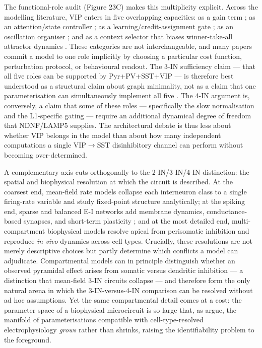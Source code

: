 \documentclass[11pt]{article}
\let\origrightarrow\rightarrow
\def\rightarrow{\ensuremath{\origrightarrow}}
\begin{document}
The functional-role audit (Figure 23C) makes this multiplicity explicit. Across the modelling literature, VIP enters in five overlapping capacities: as a gain term \citep{Hertag2019, Litwinkumar2016, Veit2023, Bos2025, Richter2022}; as an attention/state controller \citep{Garciadelmolino2017, Hahn2022, Waitzmann2024, Wagatsuma2022, Poort2022}; as a learning/credit-assignment gate \citep{Lee2025, Chevy2024, Wilmes2019, Hertag2020, Hertag2021}; as an oscillation organiser \citep{Veit2023, Cattani2024}; and as a context selector that biases winner-take-all attractor dynamics \citep{Shen2023, Yang2016, Furutachi2024}. These categories are not interchangeable, and many papers commit a model to one role implicitly by choosing a particular cost function, perturbation protocol, or behavioural readout. The 3-IN sufficiency claim --- that all five roles can be supported by Pyr+PV+SST+VIP --- is therefore best understood as a structural claim about graph minimality, not as a claim that one parameterisation can simultaneously implement all five \citep{Hertag2019, Litwinkumar2016, Bos2025}. The 4-IN argument \citep{Iqbal2025, Hartung2024, Vighagen2021} is, conversely, a claim that some of these roles --- specifically the slow normalisation and the L1-specific gating --- require an additional dynamical degree of freedom that NDNF/LAMP5 supplies. The architectural debate is thus less about whether VIP belongs in the model than about how many independent computations a single VIP\rightarrow SST disinhibitory channel can perform without becoming over-determined.

A complementary axis cuts orthogonally to the 2-IN/3-IN/4-IN distinction: the spatial and biophysical resolution at which the circuit is described. At the coarsest end, mean-field rate models \citep{Litwinkumar2016, Garciadelmolino2017, Sanzeni2020, Kim2025b} collapse each interneuron class to a single firing-rate variable and study fixed-point structure analytically; at the spiking end, sparse and balanced E-I networks \citep{Veit2023, Pedrosa2020, Rossbroich2025} add membrane dynamics, conductance-based synapses, and short-term plasticity \citep{Seay2020, Cattani2024}; and at the most detailed end, multi-compartment biophysical models \citep{Reimann2026, Jadi2012, Isbister2026, Morabito2024} resolve apical from perisomatic inhibition and reproduce \textit{in vivo} dynamics across cell types. Crucially, these resolutions are not merely descriptive choices but partly determine which conflicts a model can adjudicate. Compartmental models \citep{Reimann2026, Jadi2012, Dorsett2021} can in principle distinguish whether an observed pyramidal effect arises from somatic versus dendritic inhibition --- a distinction that mean-field 3-IN circuits collapse --- and therefore form the only natural arena in which the 3-IN-versus-4-IN comparison can be resolved without ad hoc assumptions. Yet the same compartmental detail comes at a cost: the parameter space of a biophysical microcircuit is so large that, as \citet{Reimann2026} argue, the manifold of parameterisations compatible with cell-type-resolved electrophysiology \textit{grows} rather than shrinks, raising the identifiability problem to the foreground.
\end{document}
